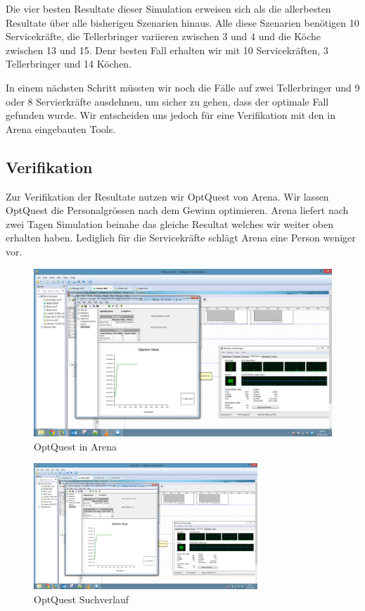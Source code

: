 \documentclass[ngerman,a4paper,12pt]{scrreprt}
\begin{document}
			Die vier besten Resultate dieser Simulation erweisen sich als die allerbesten Resultate über alle bisherigen Szenarien hinaus. Alle diese Szenarien benötigen 10 Servicekräfte, die Tellerbringer variieren zwischen 3 und 4 und die Köche zwischen 13 und 15. Denr besten Fall erhalten wir mit 10 Servicekräften, 3 Tellerbringer und 14 Köchen.
			
			In einem nächsten Schritt müssten wir noch die Fälle auf zwei Tellerbringer und 9 oder 8 Servierkräfte ausdehnen, um sicher zu gehen, dass der optimale Fall gefunden wurde. Wir entscheiden uns jedoch für eine Verifikation mit den in Arena eingebauten Tools.
		
		\subsection{Verifikation}
			Zur Verifikation der Resultate nutzen wir OptQuest von Arena. Wir lassen OptQuest die Personalgrössen nach dem Gewinn optimieren. Arena liefert nach zwei Tagen Simulation beinahe das gleiche Resultat welches wir weiter oben erhalten haben. Lediglich für die Servicekräfte schlägt Arena eine Person weniger vor.
			\begin{figure}[H]
				\centering
					\includegraphics[width=\textwidth]{img/OptQuest.PNG}
					\caption[OptQuest in Arena]{OptQuest in Arena}
					\label{optQuestInArena}
			\end{figure}
			
			\begin{figure}[H]
				\centering
					\includegraphics[trim=10cm 3.5cm 18.5cm 12.5cm, clip=true,width=0.75\textwidth]{img/OptQuest.PNG}
					\caption[OptQuest Suchverlauf]{OptQuest Suchverlauf}
					\label{optQuestSuchverlauf}
			\end{figure}
			
\end{document}
